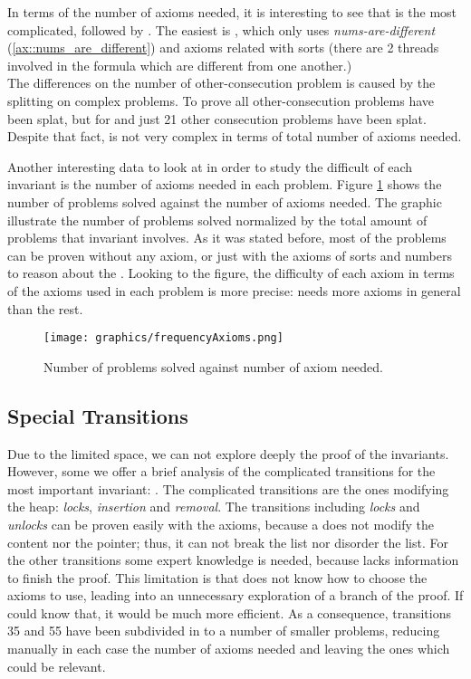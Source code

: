In terms of the number of axioms needed, it is interesting to see that \invLock is the most complicated, followed by \invNext.  
%
The easiest is \invDisjoint, which only uses \textit{nums-are-different} (\ref{ax::nums_are_different}) and axioms related with sorts (there are 2 threads involved in the formula which are different from one another.)
\\
The differences on the number of other-consecution problem is caused by the splitting on complex \spass problems. 
%
To prove \invOrder all other-consecution problems have been splat, but for \invLock and \invNext just 21 other consecution problems have been splat.
%
Despite that fact, \invOrder is not very complex in terms of total number of axioms needed.

Another interesting data to look at in order to study the difficult of each invariant is the number of axioms needed in each problem. 
%
Figure \ref{fig:frequencyAxioms} shows the number of problems solved against the number of axioms needed.
%
The graphic illustrate the number of problems solved normalized by the total amount of problems that invariant involves.
%
As it was stated before, most of the problems can be proven without any axiom, or just with the axioms of sorts and numbers to reason about the \pc.
%
Looking to the figure, the difficulty of each axiom in terms of the axioms used in each problem is more precise:
%
\invOrder needs more axioms in general than the rest.


\begin{figure}[hbtp]
\centering
\texttt{[image: graphics/frequencyAxioms.png]}
\caption{Number of problems solved against number of axiom needed.}
\label{fig:frequencyAxioms}
\end{figure}

\subsection{Special Transitions}

Due to the limited space, we can not explore deeply the proof of the invariants.
%
However, some we offer a brief analysis of the complicated transitions for the most important invariant: \invPreserve. The complicated transitions are the ones modifying the heap: \textit{locks}, \textit{insertion} and \textit{removal}. 
%
The transitions including \textit{locks} and \textit{unlocks} can be proven easily with the axioms, because a \fLock does not modify the content nor the pointer; thus, it can not break the list nor disorder the list.
%
For the other transitions some expert knowledge is needed, because \spass lacks information to finish the proof.
%
This limitation is that \spass does not know how to choose the axioms to use, leading into an unnecessary exploration of a branch of the proof. 
%
\label{infty:time}
If \spass could know that, it would be much more efficient. 
%
As a consequence, transitions 35 and 55 have been subdivided in to a number of smaller \spass problems, reducing manually in each case the number of axioms needed and leaving the ones which could be relevant.
%

